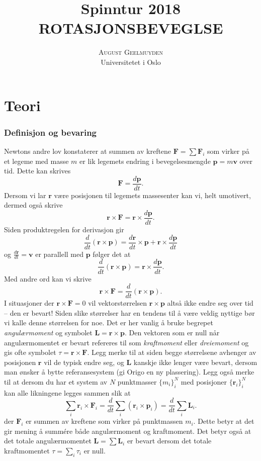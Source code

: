 \documentclass[twoside,utf8]{article}
\title{\vspace{-15mm}\fontsize{24pt}{10pt}\selectfont Spinntur 2018 \\ \textbf{ROTASJONSBEVEGLSE} } %
\author{
\large
\textsc{August Geelmuyden}\\[2mm] %
\normalsize Universitetet i Oslo \\ %
\vspace{-5mm}
}
\date{}
\begin{document}
\maketitle %




\part*{Teori}


\section{Definisjon og bevaring}
Newtons andre lov konstaterer at summen av kreftene $\mathbf{F}=\sum \mathbf{F}_i$ som virker på et legeme med masse $m$ er lik legemets endring i bevegelsesmengde $\mathbf{p}=m\mathbf{v}$ over tid. Dette kan skrives
\[
\mathbf{F} = \frac{d\mathbf{p}}{dt}.
\]
Dersom vi lar $\mathbf{r}$ være posisjonen til legemets massesenter kan vi, helt umotivert, dermed også skrive
\[
\mathbf{r}\times\mathbf{F} = \mathbf{r}\times\frac{d\mathbf{p}}{dt}.
\]
Siden produktregelen for derivasjon gir
\[
\frac{d}{dt}\left(\mathbf{r}\times \mathbf{p}\right)
= \frac{d\mathbf{r}}{dt}\times \mathbf{p}
 +\mathbf{r} \times \frac{d\mathbf{p}}{dt}
\]
og $\frac{d\mathbf{r}}{dt}=\mathbf{v}$ er parallell med $\mathbf{p}$ følger det at
\[
\frac{d}{dt}\left(\mathbf{r}\times \mathbf{p}\right)
= \mathbf{r} \times \frac{d\mathbf{p}}{dt}.
\]
Med andre ord kan vi skrive
\[
\mathbf{r}\times\mathbf{F} = \frac{d}{dt}\left(\mathbf{r}\times\mathbf{p}\right).
\]
I situasjoner der $\mathbf{r}\times\mathbf{F}=0$ vil vektorstørrelsen $\mathbf{r}\times\mathbf{p}$ altså ikke endre seg over tid -- den er bevart! Siden slike størrelser har en tendens til å være veldig nyttige bør vi kalle denne størrelsen for noe. Det er her vanlig å bruke begrepet {\it angulærmoment} og symbolet $\mathbf{L}=\mathbf{r}\times\mathbf{p}$. Den vektoren som er null når angulærmomentet er bevart refereres til som {\it kraftmoment} eller {\it dreiemoment} og gis ofte symbolet $\tau=\mathbf{r}\times\mathbf{F}$.
Legg merke til at siden begge størrelsene avhenger av posisjonen $\mathbf{r}$ vil de typisk endre seg, og $\mathbf{L}$ kanskje ikke lenger være bevart, dersom man ønsker å bytte referansesystem (gi Origo en ny plassering). Legg også merke til at dersom du har et system av $N$ punktmasser $\{m_i\}_i^N$ med posisjoner $\{\mathbf{r}_i\}_i^N$ kan alle likningene legges sammen slik at
\[
\sum_i \mathbf{r}_i\times\mathbf{F}_i = \frac{d}{dt} \sum_i \left( \mathbf{r}_i \times \mathbf{p}_i \right)= \frac{d}{dt} \sum_i \mathbf{L}_i.
\]
der $\mathbf{F}_i$ er summen av kreftene som virker på punktmassen $m_i$. Dette betyr at det gir mening å summére både angulærmoment og kraftmoment. Det betyr også at det totale angulærmomentet $\mathbf{L}=\sum \mathbf{L}_i$ er bevart dersom det totale kraftmomentet $\tau = \sum_i \tau_i$ er null.
\end{document}
